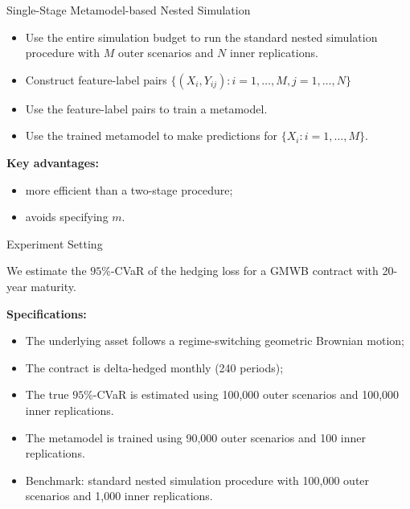 \documentclass[9pt,handout]{beamer}
\begin{document}
\begin{frame}{Single-Stage Metamodel-based Nested Simulation}

\begin{algorithm}[H]
\caption{Single-Stage Metamodel-based Nested Simulation for VAs}
\begin{algorithmic}[1]
    \begin{itemize}
        \item Use the entire simulation budget to run the standard nested simulation procedure with $M$ outer scenarios and $N$ inner replications.
        \item Construct feature-label pairs $\{(X_i, Y_{ij}) : i=1, \ldots, M, j=1, \ldots, N\}$
    \end{itemize}
    \begin{itemize}
        \item Use the feature-label pairs to train a metamodel.
        \item Use the trained metamodel to make predictions for $\{X_i: i=1, \ldots, M\}$.
    \end{itemize}
\end{algorithmic}
\end{algorithm}

\textbf{Key advantages:}
\begin{itemize}
    \item more efficient than a two-stage procedure;
    \item avoids specifying $m$.
\end{itemize}

\end{frame}

\begin{frame}{Experiment Setting}

    We estimate the $95\%$-CVaR of the hedging loss for a GMWB contract with 20-year maturity.

    \vspace{10pt}

    \textbf{Specifications:}
    \begin{itemize}
        \item The underlying asset follows a regime-switching geometric Brownian motion;
        \item The contract is delta-hedged monthly (240 periods);
        \item The true $95\%$-CVaR is estimated using 100,000 outer scenarios and 100,000 inner replications.
        \item The metamodel is trained using 90,000 outer scenarios and 100 inner replications.
        \item Benchmark: standard nested simulation procedure with 100,000 outer scenarios and 1,000 inner replications.
    \end{itemize}

\end{frame}
\end{document}
